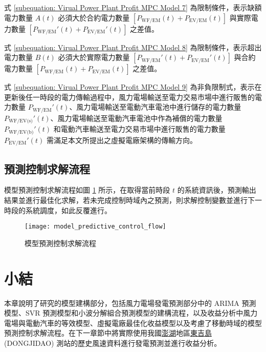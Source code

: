 式 \eqref{subequation: Virual Power Plant Profit MPC Model 7} 為限制條件，表示缺額電力數量 $A(t)$ 必須大於合約電力數量 $[P_{\text{WF/EM}}(t) + P_{\text{EV/EM}}(t)]$ 與實際電力數量 $[P_{\text{WF/EM}}'(t) + P_{\text{EV/EM}}'(t)]$ 之差值。

式 \eqref{subequation: Virual Power Plant Profit MPC Model 8} 為限制條件，表示超出電力數量 $B(t)$ 必須大於實際電力數量 $[P_{\text{WF/EM}}'(t) + P_{\text{EV/EM}}'(t)]$ 與合約電力數量 $[P_{\text{WF/EM}}(t) + P_{\text{EV/EM}}(t)]$ 之差值。

式 \eqref{subequation: Virual Power Plant Profit MPC Model 9} 為非負限制式，表示在更新後任一時段的電力傳輸過程中，風力電場輸送至電力交易市場中進行販售的電力數量 $P_{\text{WF/EM}}'(t)$、風力電場輸送至電動汽車電池中進行儲存的電力數量 $P_{\text{WF/EV(s)}}'(t)$、風力電場輸送至電動汽車電池中作為補償的電力數量 $P_{\text{WF/EV(b)}}'(t)$ 和電動汽車輸送至電力交易市場中進行販售的電力數量 $P_{\text{EV/EM}}'(t)$ 需滿足本文所提出之虛擬電廠架構的傳輸方向。

\subsection{預測控制求解流程}

模型預測控制求解流程如圖 \ref{figure: Model Predictive Control Flow} 所示，在取得當前時段 $t$ 的系統資訊後，預測輸出結果並進行最佳化求解，若未完成控制時域內之預測，則求解控制變數並進行下一時段的系統調度，如此反覆進行。

\begin{figure}[htbp]
  \centering
  \texttt{[image: ｍodel\_predictive\_control\_flow]}
  \caption{模型預測控制求解流程}
  \label{figure: Model Predictive Control Flow}
\end{figure}

\section{小結}

本章說明了研究的模型建構部分，包括風力電場發電預測部分中的 ARIMA 預測模型、SVR 預測模型和小波分解組合預測模型的建構流程，以及收益分析中風力電場與電動汽車的等效模型、虛擬電廠最佳化收益模型以及考慮了移動時域的模型預測控制求解流程。在下一章節中將實際使用我國\uline{澎湖}地區\uline{東吉島} (DONGJIDAO) 測站的歷史風速資料進行發電預測並進行收益分析。
